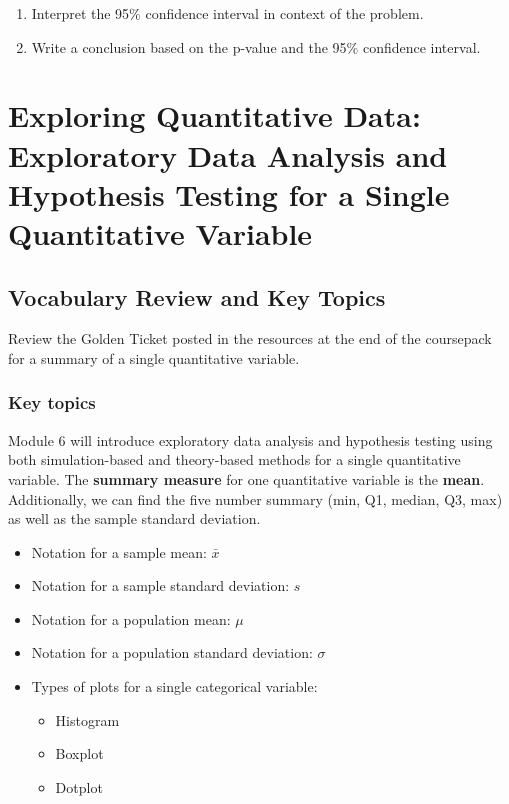 \documentclass[
]{report}
\begin{document}
\begin{enumerate}
\def\labelenumi{\arabic{enumi}.}
\setcounter{enumi}{13}
\item
  Interpret the 95\% confidence interval in context of the problem.
  \vspace{0.6in}
\item
  Write a conclusion based on the p-value and the 95\% confidence interval.
\end{enumerate}

\vspace{0.6in}

\newpage

\chapter{Exploring Quantitative Data: Exploratory Data Analysis and Hypothesis Testing for a Single Quantitative Variable}\label{exploring-quantitative-data-exploratory-data-analysis-and-hypothesis-testing-for-a-single-quantitative-variable}

\section{Vocabulary Review and Key Topics}\label{vocabulary-review-and-key-topics-4}

Review the Golden Ticket posted in the resources at the end of the coursepack for a summary of a single quantitative variable.

\subsection{Key topics}\label{key-topics-5}

Module 6 will introduce exploratory data analysis and hypothesis testing using both simulation-based and theory-based methods for a single quantitative variable.
The \textbf{summary measure} for one quantitative variable is the \textbf{mean}.
Additionally, we can find the five number summary (min, Q1, median, Q3, max) as well as the sample standard deviation.

\begin{itemize}
\item
  Notation for a sample mean: \(\bar{x}\)
\item
  Notation for a sample standard deviation: \(s\)
\item
  Notation for a population mean: \(\mu\)
\item
  Notation for a population standard deviation: \(\sigma\)
\item
  Types of plots for a single categorical variable:

  \begin{itemize}
  \item
    Histogram
  \item
    Boxplot
  \item
    Dotplot
  \end{itemize}
\end{itemize}
\end{document}
